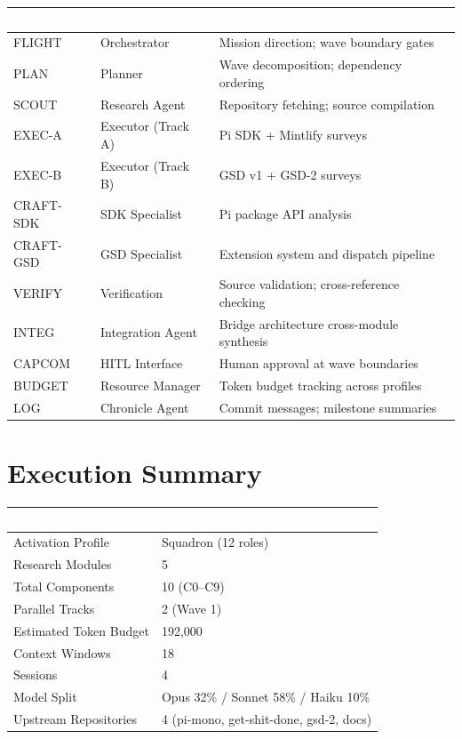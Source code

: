 \documentclass[11pt,letterpaper]{article}
\newcommand{\tableheader}[1]{\textbf{\sffamily\textcolor{white}{#1}}}
\begin{document}
\begin{center}
\begin{tabularx}{\textwidth}{L{2cm}L{2.5cm}X}
\toprule
{}
\tableheader{Role} & \tableheader{Agent} & \tableheader{Responsibility} \\
\midrule
FLIGHT & Orchestrator & Mission direction; wave boundary gates \\
PLAN & Planner & Wave decomposition; dependency ordering \\
SCOUT & Research Agent & Repository fetching; source compilation \\
EXEC-A & Executor (Track A) & Pi SDK + Mintlify surveys \\
EXEC-B & Executor (Track B) & GSD v1 + GSD-2 surveys \\
CRAFT-SDK & SDK Specialist & Pi package API analysis \\
CRAFT-GSD & GSD Specialist & Extension system and dispatch pipeline \\
VERIFY & Verification & Source validation; cross-reference checking \\
INTEG & Integration Agent & Bridge architecture cross-module synthesis \\
CAPCOM & HITL Interface & Human approval at wave boundaries \\
BUDGET & Resource Manager & Token budget tracking across profiles \\
LOG & Chronicle Agent & Commit messages; milestone summaries \\
\bottomrule
\end{tabularx}
\end{center}

\section{Execution Summary}

\begin{center}
\begin{tabularx}{\textwidth}{L{5cm}X}
\toprule
{}
\tableheader{Metric} & \tableheader{Value} \\
\midrule
Activation Profile & Squadron (12 roles) \\
Research Modules & 5 \\
Total Components & 10 (C0--C9) \\
Parallel Tracks & 2 (Wave 1) \\
Estimated Token Budget & 192,000 \\
Context Windows & 18 \\
Sessions & 4 \\
Model Split & Opus 32\% / Sonnet 58\% / Haiku 10\% \\
Upstream Repositories & 4 (pi-mono, get-shit-done, gsd-2, docs) \\
\bottomrule
\end{tabularx}
\end{center}
\end{document}
